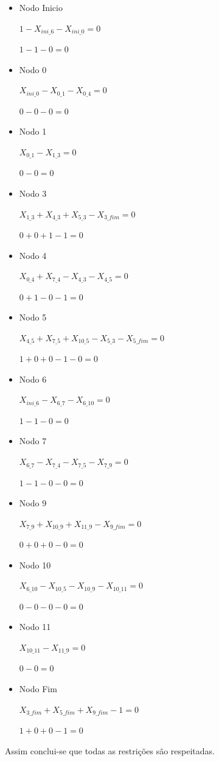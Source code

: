 \begin{itemize}

\item Nodo Inicio 

$1-X_{ini\_6} - X_{ini\_0} = 0$

$1 - 1 - 0 = 0$

\item Nodo 0 

$X_{ini\_0}-X_{0\_1}-X_{0\_4} = 0$

$0 - 0 - 0 = 0$

\item Nodo 1 

$	X_{0\_1}-X_{1\_3} = 0$

$0 - 0 = 0$

\item Nodo 3 

$	X_{1\_3} + X_{4\_3} + X_{5\_3}-X_{3\_fim} = 0$

$0 + 0 + 1 - 1 = 0$

\item Nodo 4 

$	X_{0\_4} + X_{7\_4} - X_{4\_3} - X_{4\_5} = 0$

$0 + 1 - 0 - 1= 0$

\item Nodo 5 

$X_{4\_5} + X_{7\_5} + X_{10\_5} - X_{5\_3} - X_{5\_fim} = 0$

$1 + 0 + 0 - 1 - 0 = 0$

\item Nodo 6 

$X_{ini\_6} - X_{6\_7} - X_{6\_10} = 0$

$1 - 1 - 0 = 0$

\item Nodo 7 

$X_{6\_7}- X_{7\_4}- X_{7\_5} - X_{7\_9} = 0$

$1 - 1 - 0 - 0 = 0$

\item Nodo 9 

$X_{7\_9} + X_{10\_9} + X_{11\_9} - X_{9\_fim} = 0$

$0 + 0 + 0 - 0 = 0$

\item Nodo 10 

$X_{6\_10} - X_{10\_5} - X_{10\_9} - X_{10\_11} = 0$

$0 - 0 - 0 - 0 = 0$

\item Nodo 11 

$X_{10\_11} - X_{11\_9} = 0$

$0 - 0 = 0$

\item Nodo Fim 

$X_{3\_fim} + X_{5\_fim} + X_{9\_fim} - 1 = 0$

$1 + 0 + 0 - 1 = 0$

\end{itemize}

Assim conclui-se que todas as restrições são respeitadas.







